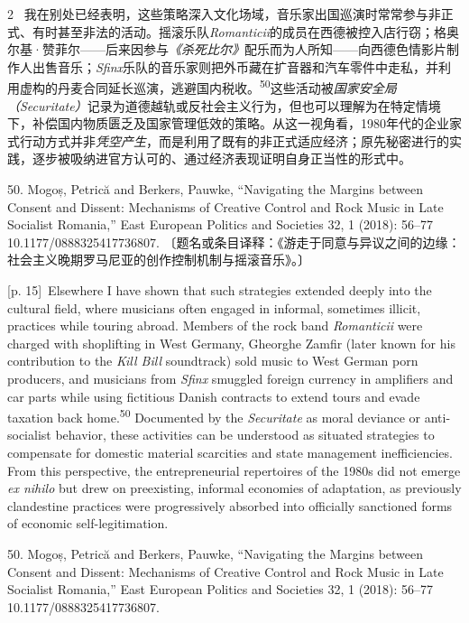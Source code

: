 \documentclass[10pt,a4paper]{article}
\begin{document}
\begin{paracol}{2}
\switchcolumn*
{\scriptsize\color{gray} [p. 15]}\ 我在别处已经表明，这些策略深入文化场域，音乐家出国巡演时常常参与非正式、有时甚至非法的活动。摇滚乐队\textit{Romanticii}的成员在西德被控入店行窃；格奥尔基·赞菲尔——后来因参与\textit{《杀死比尔》}配乐而为人所知——向西德色情影片制作人出售音乐；\textit{Sfinx}乐队的音乐家则把外币藏在扩音器和汽车零件中走私，并利用虚构的丹麦合同延长巡演，逃避国内税\mbox{收。\textsuperscript{50}}这些活动被\textit{国家安全局（Securitate）}记录为道德越轨或反社会主义行为，但也可以理解为在特定情境下，补偿国内物质匮乏及国家管理低效的策略。从这一视角看，1980年代的企业家式行动方式并非\textit{凭空产生}，而是利用了既有的非正式适应经济；原先秘密进行的实践，逐步被吸纳进官方认可的、通过经济表现证明自身正当性的形式中。\par{\small 50. Mogoș, Petrică and Berkers, Pauwke, “Navigating the Margins between Consent and Dissent: Mechanisms of Creative Control and Rock Music in Late Socialist Romania,” East European Politics and Societies 32, 1 (2018): 56–77 10.1177/0888325417736807. 〔题名或条目译释：《游走于同意与异议之间的边缘：社会主义晚期罗马尼亚的创作控制机制与摇滚音乐》。〕\par}
\switchcolumn
{\scriptsize\color{gray} [p. 15]}\ Elsewhere I have shown that such strategies extended deeply into the cultural field, where musicians often engaged in informal, sometimes illicit, practices while touring abroad. Members of the rock band \textit{Romanticii} were charged with shoplifting in West Germany, Gheorghe Zamfir (later known for his contribution to the \textit{Kill Bill} soundtrack) sold music to West German porn producers, and musicians from \textit{Sfinx} smuggled foreign currency in amplifiers and car parts while using fictitious Danish contracts to extend tours and evade taxation back home.\nobreak\textsuperscript{50} Documented by the \textit{Securitate} as moral deviance or anti-socialist behavior, these activities can be understood as situated strategies to compensate for domestic material scarcities and state management inefficiencies. From this perspective, the entrepreneurial repertoires of the 1980s did not emerge \textit{ex nihilo} but drew on preexisting, informal economies of adaptation, as previously clandestine practices were progressively absorbed into officially sanctioned forms of economic self-legitimation.\par{\small 50. Mogoș, Petrică and Berkers, Pauwke, “Navigating the Margins between Consent and Dissent: Mechanisms of Creative Control and Rock Music in Late Socialist Romania,” East European Politics and Societies 32, 1 (2018): 56–77 10.1177/0888325417736807.\par}

\end{paracol}
\end{document}
